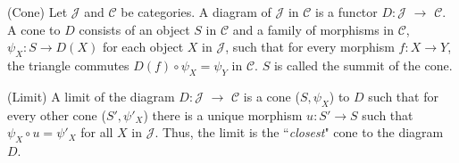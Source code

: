 
 \begin{definition} (Cone) Let $\mathcal{J}$ and $\mathcal{C}$ be categories. A diagram of $\mathcal{J}$ in $\mathcal{C}$ is a functor $D:$$\mathcal{J}$ $\to$ $\mathcal{C}$. A cone to  $D$ consists of an object $S$ in $\mathcal{C}$ and a family of morphisms in $\mathcal{C}$, $\psi_X: S \to D(X) $ for each object $X$ in $\mathcal{J}$, such that for every morphism $f: X \to Y$, the triangle commutes $D(f) \circ \psi_X = \psi_Y$ in $\mathcal{C}$. $S$ is called the summit of the cone.
\end{definition}

\begin{definition} (Limit) A limit of the diagram $D:$$\mathcal{J}$ $\to$ $\mathcal{C}$ is a cone ($S, \psi_X$) to $D$ such that for every other cone ($S', \psi'_X$) there is a unique morphism $u: S' \to S$ such that $\psi_X \circ u = \psi'_X$ for all $X$ in $\mathcal{J}$. Thus, the limit is the ``\textit{closest}" cone to the diagram $D$. 
\end{definition}







